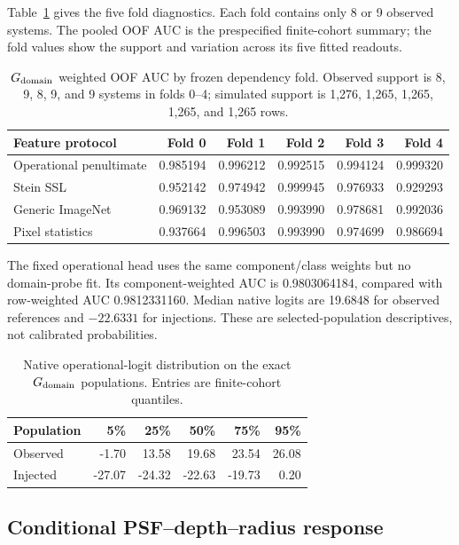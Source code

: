 Table~\ref{tab:gdomain_fold_diagnostics} gives the five fold diagnostics.
Each fold contains only 8 or 9 observed systems. The pooled OOF AUC is the
prespecified finite-cohort summary; the fold values show the support and
variation across its five fitted readouts.

\begin{table}
\caption{\(G_{\rm domain}\) weighted OOF AUC by frozen dependency fold.
Observed support is 8, 9, 8, 9, and 9 systems in folds 0--4; simulated support
is 1,276, 1,265, 1,265, 1,265, and 1,265 rows.}
\label{tab:gdomain_fold_diagnostics}
\centering
\begin{tabular}{lrrrrr}
\toprule
Feature protocol & Fold 0 & Fold 1 & Fold 2 & Fold 3 & Fold 4 \\
\midrule
Operational penultimate & 0.985194 & 0.996212 & 0.992515 & 0.994124 & 0.999320 \\
Stein SSL & 0.952142 & 0.974942 & 0.999945 & 0.976933 & 0.929293 \\
Generic ImageNet & 0.969132 & 0.953089 & 0.993990 & 0.978681 & 0.992036 \\
Pixel statistics & 0.937664 & 0.996503 & 0.993990 & 0.974699 & 0.986694 \\
\bottomrule
\end{tabular}
\end{table}

The fixed operational head uses the same component/class weights but no
domain-probe fit. Its component-weighted AUC is 0.9803064184, compared with
row-weighted AUC 0.9812331160. Median native logits are 19.6848 for observed
references and \(-22.6331\) for injections. These are selected-population
descriptives, not calibrated probabilities.

\begin{table}
\caption{Native operational-logit distribution on the exact
\(G_{\rm domain}\) populations. Entries are finite-cohort quantiles.}
\label{tab:fixed_head_logit_quantiles}
\centering
\begin{tabular}{lrrrrr}
\toprule
Population & 5\% & 25\% & 50\% & 75\% & 95\% \\
\midrule
Observed & -1.70 & 13.58 & 19.68 & 23.54 & 26.08 \\
Injected & -27.07 & -24.32 & -22.63 & -19.73 & 0.20 \\
\bottomrule
\end{tabular}
\end{table}

\subsection{Conditional PSF--depth--radius response}
\label{app:cell_radius_response}

